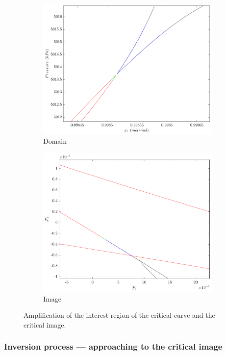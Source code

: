 \documentclass[journal=iecred,manuscript=article]{achemso}
\theoremstyle{definition}
\theoremstyle{remark}
\begin{document}
\begin{figure}
\centering
\begin{subfigure}{.5\textwidth}
  \centering
  \includegraphics[width=.9\linewidth]{bicos_dominio}
  \caption{Domain}
  \label{fig:sub1}
\end{subfigure}%
\begin{subfigure}{.5\textwidth}
  \centering
  \includegraphics[width=.9\linewidth]{bicos_imagem}
  \caption{Image}
  \label{fig:sub2}
\end{subfigure}
\caption{Amplification of the interest region of the critical curve and the critical image.}
\label{fig:domain_image}
\end{figure}

\subsubsection{Inversion process --- approaching to the critical image}
\end{document}
